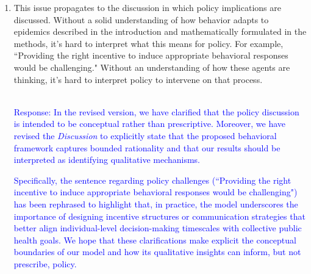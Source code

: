 \documentclass{article}
\newcommand{\blue}[1]{{\textcolor{blue}{#1}}}
\begin{document}
\begin{enumerate}
    \item This issue propagates to the discussion in which policy implications are discussed. Without a solid understanding of how behavior adapts to epidemics described in the introduction and mathematically formulated in the methods, it's hard to interpret what this means for policy. For example, ``Providing the right incentive to induce appropriate behavioral responses would be challenging." Without an understanding of how these agents are thinking, it's hard to interpret policy to intervene on that process.

    \blue{\\Response:
    In the revised version, we have clarified that the policy discussion is intended to be conceptual rather than prescriptive. Moreover, we have revised the \textit{Discussion} to explicitly state that the proposed behavioral framework captures bounded rationality and that our results should be interpreted as identifying qualitative mechanisms.
    
    Specifically, the sentence regarding policy challenges (``Providing the right incentive to induce appropriate behavioral responses would be challenging") has been rephrased to highlight that, in practice, the model underscores the importance of designing incentive structures or communication strategies that better align individual-level decision-making timescales with collective public health goals. We hope that these clarifications make explicit the conceptual boundaries of our model and how its qualitative insights can inform, but not prescribe, policy.
    }


\end{enumerate}
\end{document}
